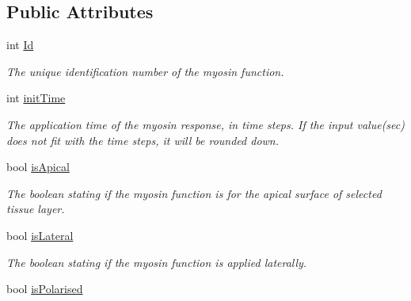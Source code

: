 \subsection*{Public Attributes}
\begin{DoxyCompactItemize}
\item 
\hypertarget{classMyosinFunction_a718e298e9ed8eee2b037fd08d7bd4373}{}int \hyperlink{classMyosinFunction_a718e298e9ed8eee2b037fd08d7bd4373}{Id}\label{classMyosinFunction_a718e298e9ed8eee2b037fd08d7bd4373}

\begin{DoxyCompactList}\small\item\em The unique identification number of the myosin function. \end{DoxyCompactList}\item 
\hypertarget{classMyosinFunction_a5bf0e10f1e37ef01762fe72305d2e4d2}{}int \hyperlink{classMyosinFunction_a5bf0e10f1e37ef01762fe72305d2e4d2}{init\+Time}\label{classMyosinFunction_a5bf0e10f1e37ef01762fe72305d2e4d2}

\begin{DoxyCompactList}\small\item\em The application time of the myosin response, in time steps. If the input value(sec) does not fit with the time steps, it will be rounded down. \end{DoxyCompactList}\item 
\hypertarget{classMyosinFunction_a413c9a88624a97f6483efebdc5ab6fac}{}bool \hyperlink{classMyosinFunction_a413c9a88624a97f6483efebdc5ab6fac}{is\+Apical}\label{classMyosinFunction_a413c9a88624a97f6483efebdc5ab6fac}

\begin{DoxyCompactList}\small\item\em The boolean stating if the myosin function is for the apical surface of selected tissue layer. \end{DoxyCompactList}\item 
\hypertarget{classMyosinFunction_ae4176116404c97b86f7e76ee359f8499}{}bool \hyperlink{classMyosinFunction_ae4176116404c97b86f7e76ee359f8499}{is\+Lateral}\label{classMyosinFunction_ae4176116404c97b86f7e76ee359f8499}

\begin{DoxyCompactList}\small\item\em The boolean stating if the myosin function is applied laterally. \end{DoxyCompactList}\item 
\hypertarget{classMyosinFunction_a66bf31a5b46a19e67691d67b25c03852}{}bool \hyperlink{classMyosinFunction_a66bf31a5b46a19e67691d67b25c03852}{is\+Polarised}\label{classMyosinFunction_a66bf31a5b46a19e67691d67b25c03852}


\end{DoxyCompactItemize}
